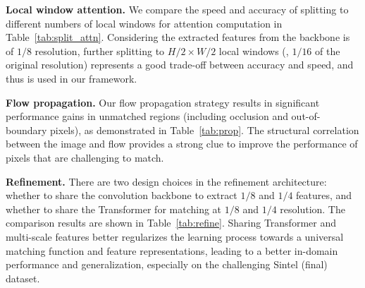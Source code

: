 \documentclass[10pt,twocolumn,letterpaper]{article}
\begin{document}
\begin{table*}[t]
\begin{tabular}{lccccccccccccccr}
    
    \bottomrule
    \end{tabular}
    \vspace{-5pt}
    \caption{\textbf{RAFT's iterative framework \textit{vs.} our GMFlow framework}. The models are trained on FlyingChairs and FlyingThings3D training sets. We use RAFT's officially released model for evaluation. We denote our model without refinement as 1 iteration, and with refinement as 2 iterations. The inference time is measured on a single V100 and A100 (in parentheses) GPU at Sintel resolution ($436\times 1024$). Our framework gains more speedup than RAFT ($2.21\times$ \vs. $1.87 \times$, \ie, ours: $126 \to 57$, RAFT: $170 \to 91$) on the high-end A100 GPU since our method doesn't require a large number of sequential computation.
    }
    \label{tab:raft_vs_ours}
    \vspace{-10pt}
\end{table*}


{\bf Local window attention.} We compare the speed and accuracy of splitting to different numbers of local windows for attention computation in Table~\ref{tab:split_attn}. Considering the extracted features from the backbone is of $1/8$ resolution, further splitting to $H/2 \times W /2$ local windows (\ie, $1/16$ of the original resolution) represents a good trade-off between accuracy and speed, and thus is used in our framework.


{\bf Flow propagation.} Our flow propagation strategy results in significant performance gains in unmatched regions (including occlusion and out-of-boundary pixels), as demonstrated in Table~\ref{tab:prop}. The structural correlation between the image and flow provides a strong clue to improve the performance of pixels that are challenging to match. 


{\bf Refinement.} There are two design choices in the refinement architecture: whether to share the convolution backbone to extract $1/8$ and $1/4$ features, and whether to share the Transformer for matching at $1/8$ and $1/4$ resolution. The comparison results are shown in Table~\ref{tab:refine}. Sharing Transformer and multi-scale features better regularizes the learning process towards a universal matching function and feature representations, leading to a better in-domain performance and generalization, especially on the challenging Sintel (final) dataset.
\end{document}
